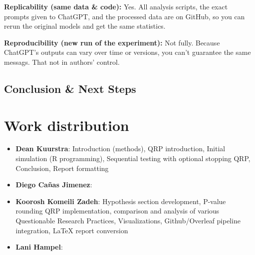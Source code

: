 \documentclass[12pt]{article}
\begin{document}
\textbf{Replicability (same data \& code):} Yes. All analysis scripts, the exact prompts given to ChatGPT, and the processed data are on GitHub, so you can rerun the original models and get the same statistics.

\textbf{Reproducibility (new run of the experiment):} Not fully. Because ChatGPT’s outputs can vary over time or versions, you can’t guarantee the same messags. That not in authors’ control.

\subsection{Conclusion \& Next Steps}

\section{Work distribution}
    \begin{itemize}
        \item[] \textbf{Dean Kuurstra}: Introduction (methods), QRP introduction, Initial simulation (R programming), Sequential testing with optional stopping QRP, Conclusion, Report formatting
        \item[] \textbf{Diego Cañas Jimenez}:
        \item[] \textbf{Koorosh Komeili Zadeh}: Hypothesis section development, P-value rounding QRP implementation, comparison and analysis of various Questionable Research Practices, Visualizations,  Github/Overleaf pipeline integration, LaTeX report conversion
        \item[] \textbf{Lani Hampel}:
        \\
    \end{itemize}

 

\end{document}
